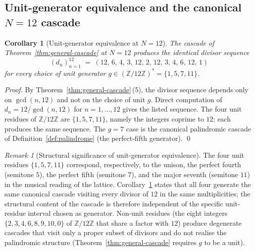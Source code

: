 \documentclass[11pt,a4paper]{article}
\newtheorem{corollary}[theorem]{Corollary}
\theoremstyle{definition}
\theoremstyle{remark}
\newtheorem{remark}[theorem]{Remark}
\begin{document}
\subsection{Unit-generator equivalence and the canonical $N=12$ cascade}\label{subsec:unit-equivalence}

\begin{corollary}[Unit-generator equivalence at $N=12$]\label{cor:unit-equivalence}
The cascade of Theorem~\ref{thm:general-cascade} at $N=12$ produces the identical divisor sequence
\[
(d_{n})_{n=1}^{12} \;=\; (12,\,6,\,4,\,3,\,12,\,2,\,12,\,3,\,4,\,6,\,12,\,1)
\]
for every choice of unit generator $g \in (\mathbb{Z}/12\mathbb{Z})^{*} = \{1,5,7,11\}$.
\end{corollary}

\begin{proof}
By Theorem~\ref{thm:general-cascade}\,(5), the divisor sequence depends only on $\gcd(n,12)$ and not on the choice of unit $g$. Direct computation of $d_{n} = 12/\gcd(n,12)$ for $n = 1,\ldots,12$ gives the listed sequence. The four unit residues of $\mathbb{Z}/12\mathbb{Z}$ are $\{1,5,7,11\}$, namely the integers coprime to $12$; each produces the same sequence. The $g=7$ case is the canonical palindromic cascade of Definition~\ref{def:palindrome} (the perfect-fifth generator). \qed
\end{proof}

\begin{remark}[Structural significance of unit-generator equivalence]\label{rem:unit-equiv}
The four unit residues $\{1,5,7,11\}$ correspond, respectively, to the unison, the perfect fourth (semitone $5$), the perfect fifth (semitone $7$), and the major seventh (semitone $11$) in the musical reading of the lattice. Corollary~\ref{cor:unit-equivalence} states that all four generate the same canonical cascade visiting every divisor of $12$ in the same multiplicities; the structural content of the cascade is therefore independent of the specific unit-residue interval chosen as generator. Non-unit residues (the eight integers $\{2,3,4,6,8,9,10,0\}$ of $\mathbb{Z}/12\mathbb{Z}$ that share a factor with $12$) produce degenerate cascades that visit only a proper subset of divisors and do not realise the palindromic structure (Theorem~\ref{thm:general-cascade} requires $g$ to be a unit).
\end{remark}
\end{document}
